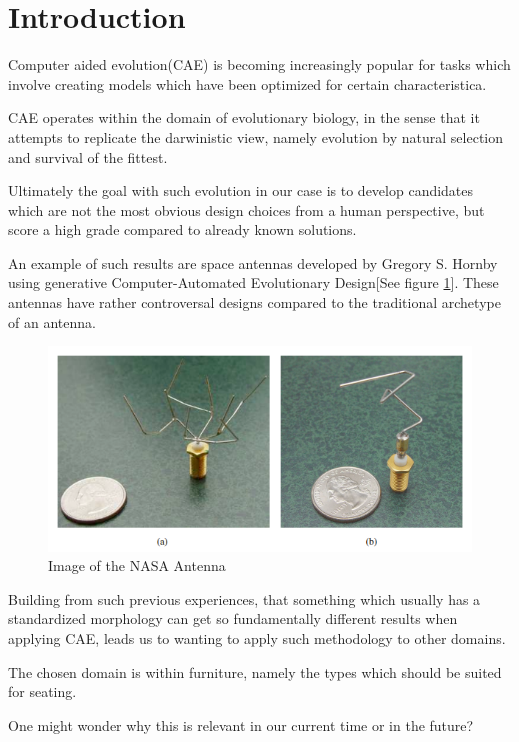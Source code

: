 \section{Introduction}
Computer aided evolution(CAE) is becoming increasingly popular for tasks which involve creating models which have been optimized for certain characteristica.

CAE operates within the domain of evolutionary biology, in the sense that it attempts to replicate the darwinistic view, namely evolution by natural selection and survival of the fittest\cite{paper:ev3}.
 
Ultimately the goal with such evolution in our case is to develop candidates which are not the most obvious design choices from a human perspective, but score a high grade compared to already known solutions.

An example of such results are space antennas developed by Gregory S. Hornby\cite{paper:ev4} using generative Computer-Automated Evolutionary Design[See figure \ref{fig:nasa_antenna}].
These antennas have rather controversal designs compared to the traditional archetype of an antenna.

\begin{figure}[ht]
\includegraphics[scale=.7]{content/img/space_antenna}
\caption{Image of the NASA Antenna \cite{paper:ev4} }
\label{fig:nasa_antenna}
\end{figure}

Building from such previous experiences, that something which usually has a standardized morphology can get so fundamentally different results when applying CAE, leads us to wanting to apply such methodology to other domains.

The chosen domain is within furniture, namely the types which should be suited for seating.

One might wonder why this is relevant in our current time or in the future?

